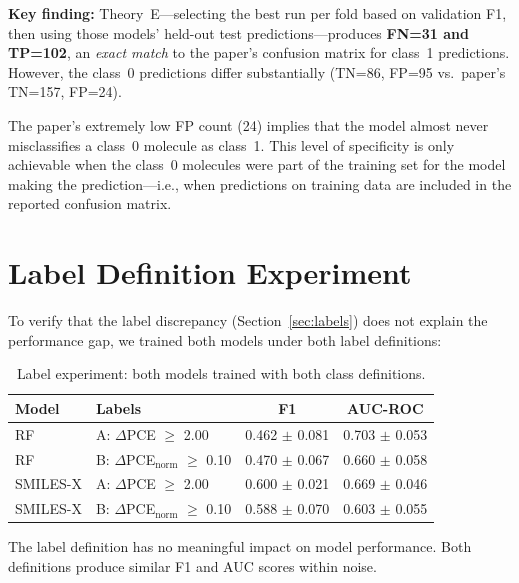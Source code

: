 \documentclass[11pt,a4paper]{article}
\begin{document}
\textbf{Key finding:} Theory~E---selecting the best run per fold based on validation F1, then using those models' held-out test predictions---produces \textbf{FN=31 and TP=102}, an \textit{exact match} to the paper's confusion matrix for class~1 predictions. However, the class~0 predictions differ substantially (TN=86, FP=95 vs.\ paper's TN=157, FP=24).

The paper's extremely low FP count (24) implies that the model almost never misclassifies a class~0 molecule as class~1. This level of specificity is only achievable when the class~0 molecules were part of the training set for the model making the prediction---i.e., when predictions on training data are included in the reported confusion matrix.

\section{Label Definition Experiment}
\label{sec:label_experiment}

To verify that the label discrepancy (Section~\ref{sec:labels}) does not explain the performance gap, we trained both models under both label definitions:

\begin{table}[H]
\centering
\caption{Label experiment: both models trained with both class definitions.}
\label{tab:label_exp}
\begin{tabular}{llcc}
\toprule
Model & Labels & F1 & AUC-ROC \\
\midrule
RF & A: $\Delta$PCE $\geq$ 2.00 & 0.462 $\pm$ 0.081 & 0.703 $\pm$ 0.053 \\
RF & B: $\Delta$PCE$_{\text{norm}}$ $\geq$ 0.10 & 0.470 $\pm$ 0.067 & 0.660 $\pm$ 0.058 \\
SMILES-X & A: $\Delta$PCE $\geq$ 2.00 & 0.600 $\pm$ 0.021 & 0.669 $\pm$ 0.046 \\
SMILES-X & B: $\Delta$PCE$_{\text{norm}}$ $\geq$ 0.10 & 0.588 $\pm$ 0.070 & 0.603 $\pm$ 0.055 \\
\bottomrule
\end{tabular}
\end{table}

The label definition has no meaningful impact on model performance. Both definitions produce similar F1 and AUC scores within noise.

\end{document}
